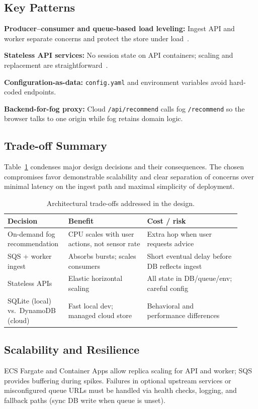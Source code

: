 \documentclass[conference]{IEEEtran}
\begin{document}
\subsection{Key Patterns}
\textbf{Producer--consumer and queue-based load leveling:} Ingest API and worker separate concerns and protect the store under load~\cite{azurepatterns}.

\textbf{Stateless API services:} No session state on API containers; scaling and replacement are straightforward~\cite{newman2021,fowler}.

\textbf{Configuration-as-data:} \texttt{config.yaml} and environment variables avoid hard-coded endpoints.

\textbf{Backend-for-fog proxy:} Cloud \texttt{/api/recommend} calls fog \texttt{/recommend} so the browser talks to one origin while fog retains domain logic.

\subsection{Trade-off Summary}
Table~\ref{tab:tradeoffs} condenses major design decisions and their consequences. The chosen compromises favor demonstrable scalability and clear separation of concerns over minimal latency on the ingest path and maximal simplicity of deployment.

\begin{table}[htbp]
\centering
\caption{Architectural trade-offs addressed in the design.}
\label{tab:tradeoffs}
\begin{tabular}{@{}p{0.22\linewidth}p{0.32\linewidth}p{0.38\linewidth}@{}}
\toprule
\textbf{Decision} & \textbf{Benefit} & \textbf{Cost / risk} \\
\midrule
On-demand fog recommendation & CPU scales with user actions, not sensor rate & Extra hop when user requests advice \\
SQS + worker ingest & Absorbs bursts; scales consumers & Short eventual delay before DB reflects ingest \\
Stateless APIs & Elastic horizontal scaling & All state in DB/queue/env; careful config \\
SQLite (local) vs.\ DynamoDB (cloud) & Fast local dev; managed cloud store & Behavioral and performance differences \\
\bottomrule
\end{tabular}
\end{table}

\subsection{Scalability and Resilience}
ECS Fargate and Container Apps allow replica scaling for API and worker; SQS provides buffering during spikes. Failures in optional upstream services or misconfigured queue URLs must be handled via health checks, logging, and fallback paths (sync DB write when queue is unset).
\end{document}
